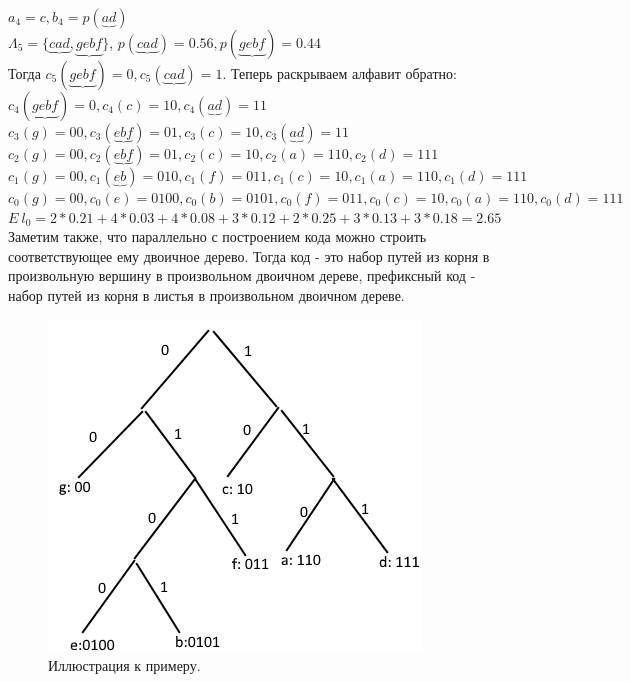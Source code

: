 $a_4 = c, b_4 = p(\underbrace{ad})$\\
$\Lambda_5 = \{\underbrace{cad}, \underbrace{gebf}\}$, $p(\underbrace{cad}) = 0.56, p(\underbrace{gebf}) = 0.44$\\
Тогда $c_5(\underbrace{gebf}) = 0, c_5(\underbrace{cad}) = 1$. Теперь раскрываем алфавит обратно:\\
$c_4(\underbrace{gebf}) = 0, c_4(c) = 10, c_4(\underbrace{ad}) = 11$\\
$c_3(g) = 00, c_3(\underbrace{ebf}) = 01, c_3(c) = 10, c_3(\underbrace{ad}) = 11$\\
$c_2(g) = 00, c_2(\underbrace{ebf}) = 01, c_2(c) = 10, c_2(a) = 110, c_2(d) = 111$\\
$c_1(g) = 00, c_1(\underbrace{eb}) = 010, c_1(f) = 011, c_1(c) = 10, c_1(a) = 110, c_1(d) = 111$\\
$c_0(g) = 00, c_0(e) = 0100, c_0(b) = 0101, c_0(f) = 011, c_0(c) = 10, c_0(a) = 110, c_0(d) = 111$\\
$E \: l_0 = 2 * 0.21 + 4 * 0.03 + 4 * 0.08 + 3 * 0.12 + 2 * 0.25 + 3 * 0.13 + 3 * 0.18 = 2.65$\\
Заметим также, что параллельно с построением кода можно строить соответствующее ему двоичное дерево. Тогда код - это набор путей из корня в произвольную вершину в произвольном двоичном дереве, префиксный код - набор путей из корня в листья в произвольном двоичном дереве.
\begin{figure}[H]
\includegraphics[width=\linewidth]{Huffman.png}
\caption{Иллюстрация к примеру.}
\label{fig:Huffman}
\end{figure}